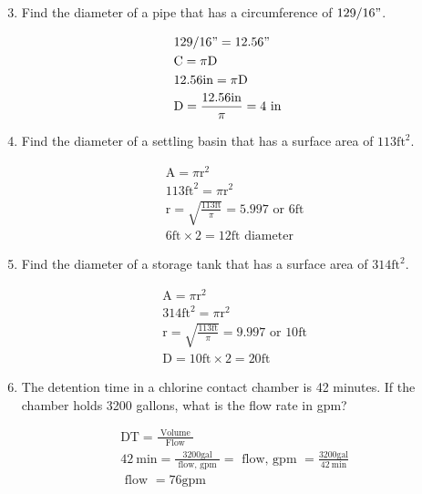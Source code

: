 \documentclass[10pt]{article}
\begin{document}
\begin{enumerate}
  \setcounter{enumi}{2}
  \item Find the diameter of a pipe that has a circumference of $129 / 16 "$.
\end{enumerate}
$$
\begin{aligned}
&129 / 16 "=12.56 " \\
&\mathrm{C}=\pi \mathrm{D} \\
&12.56 \mathrm{in}=\pi \mathrm{D} \\
&\mathrm{D}=\frac{12.56 \mathrm{in}}{\pi}=4 \text { in }
\end{aligned}
$$

\begin{enumerate}
  \setcounter{enumi}{3}
  \item Find the diameter of a settling basin that has a surface area of $113 \mathrm{ft}^{2}$.
\end{enumerate}
$$
\begin{aligned}
&\mathrm{A}=\pi \mathrm{r}^{2} \\
&113 \mathrm{ft}^{2}=\pi \mathrm{r}^{2} \\
&\mathrm{r}=\sqrt{\frac{113 \mathrm{ft}}{\pi}}=5.997 \text { or } 6 \mathrm{ft} \\
&6 \mathrm{ft} \times 2=12 \mathrm{ft} \text { diameter }
\end{aligned}
$$

\begin{enumerate}
  \setcounter{enumi}{4}
  \item Find the diameter of a storage tank that has a surface area of $314 \mathrm{ft}^{2}$.
\end{enumerate}
$$
\begin{aligned}
&\mathrm{A}=\pi \mathrm{r}^{2} \\
&314 \mathrm{ft}^{2}=\pi \mathrm{r}^{2} \\
&\mathrm{r}=\sqrt{\frac{113 \mathrm{ft}}{\pi}}=9.997 \text { or } 10 \mathrm{ft} \\
&\mathrm{D}=10 \mathrm{ft} \times 2=20 \mathrm{ft}
\end{aligned}
$$

\begin{enumerate}
  \setcounter{enumi}{5}
  \item The detention time in a chlorine contact chamber is 42 minutes. If the chamber holds 3200 gallons, what is the flow rate in gpm?
\end{enumerate}
$$
\begin{aligned}
&\mathrm{DT}=\frac{\text { Volume }}{\text { Flow }} \\
&42 \mathrm{~min}=\frac{3200 \mathrm{gal}}{\text { flow, gpm }}=\text { flow, gpm }=\frac{3200 \mathrm{gal}}{42 \mathrm{~min}} \\
&\text { flow }=76 \mathrm{gpm}
\end{aligned}
$$
\end{document}
